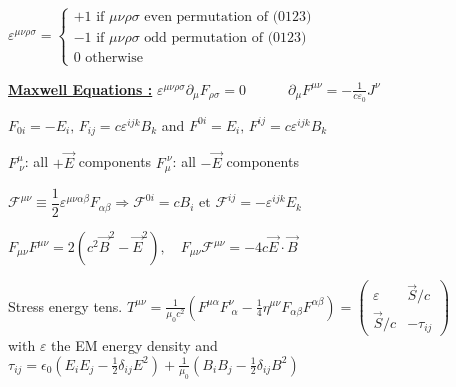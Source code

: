 \begin{squishlist}
\item $\varepsilon^{\mu\nu\rho\sigma} = 
\begin{cases}
+1 \, \, \text{if $\mu\nu\rho\sigma$ even permutation of (0123)}  \\
-1 \, \, \text{if $\mu\nu\rho\sigma$ odd permutation of (0123)} \\
0 \, \, \text{otherwise}	
\end{cases}$
\item \textbf{\underline{Maxwell Equations :}}\quad
	$\varepsilon^{\mu \nu \rho \sigma}\partial_\mu F_{\rho \sigma}=0  \qquad \quad  \partial_\mu F^{\mu\nu}=-\frac{1}{c\varepsilon_0}J^\nu $


\item $F_{0i} = -E_i, \,  F_{ij} =  c \varepsilon^{ijk}B_k$ and $F^{0i} = E_i, \, F^{ij} = c\varepsilon^{ijk}B_k$
\item $F^{\mu}_{\ \nu}$: all $+ \vec{E}$ components \squishsep $F_{\mu}^{\ \nu}$: all  $- \vec{E}$ components

\item $\mathcal{F}^{\mu\nu} \equiv \dfrac{1}{2} \varepsilon^{\mu\nu\alpha\beta}F_{\alpha\beta} \Rightarrow \mathcal{F}^{0i} = cB_i \,\, \text{et} \,\, \mathcal{F}^{ij} = -\varepsilon^{ijk}E_k$

\item $F_{\mu\nu}F^{\mu\nu} = 2(c^2\vec{B}^2 - \vec{E}^2), \quad F_{\mu\nu}\mathcal{F}^{\mu\nu} = -4c\vec{E}\cdot\vec{B}$
\item Stress energy tens. $T^{\mu \nu} = \frac{1}{\mu_0 c^2} \left( F^{\mu \alpha}F^{\nu}_{\; \alpha} - \frac{1}{4} \eta^{\mu \nu} F_{\alpha \beta}F^{\alpha \beta}\right) = 
\begin{pmatrix} \varepsilon & \vec{S}/c \\ \vec{S}/c & -\tau_{ij} \end{pmatrix}$\\
with $\varepsilon$ the EM energy density and $\tau_{ij} = \epsilon_0 ( E_i E_j - \frac{1}{2}\delta_{ij}E^2) + \frac{1}{\mu_0}(B_i B_j - \frac{1}{2}\delta_{ij} B^2)$


\end{squishlist}

